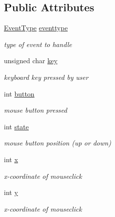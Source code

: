 \subsection*{Public Attributes}
\begin{DoxyCompactItemize}
\item 
\hypertarget{structEvent_ac88c22138e81d007cff4cab436f1143b}{}\hyperlink{util_8h_a2628ea8d12e8b2563c32f05dc7fff6fa}{Event\+Type} \hyperlink{structEvent_ac88c22138e81d007cff4cab436f1143b}{eventtype}\label{structEvent_ac88c22138e81d007cff4cab436f1143b}

\begin{DoxyCompactList}\small\item\em type of event to handle \end{DoxyCompactList}\item 
\hypertarget{structEvent_afd595f11f3290cb27aaf925f1b429783}{}unsigned char \hyperlink{structEvent_afd595f11f3290cb27aaf925f1b429783}{key}\label{structEvent_afd595f11f3290cb27aaf925f1b429783}

\begin{DoxyCompactList}\small\item\em keyboard key pressed by user \end{DoxyCompactList}\item 
\hypertarget{structEvent_a2b66667c284e4ec706958dbdf1bfc12b}{}int \hyperlink{structEvent_a2b66667c284e4ec706958dbdf1bfc12b}{button}\label{structEvent_a2b66667c284e4ec706958dbdf1bfc12b}

\begin{DoxyCompactList}\small\item\em mouse button pressed \end{DoxyCompactList}\item 
\hypertarget{structEvent_a1002e96b4f00878fb4751296cf7ae6fd}{}int \hyperlink{structEvent_a1002e96b4f00878fb4751296cf7ae6fd}{state}\label{structEvent_a1002e96b4f00878fb4751296cf7ae6fd}

\begin{DoxyCompactList}\small\item\em mouse button position (up or down) \end{DoxyCompactList}\item 
\hypertarget{structEvent_ab451062e9ceee3ff4ebbc5bfcb4a2af6}{}int \hyperlink{structEvent_ab451062e9ceee3ff4ebbc5bfcb4a2af6}{x}\label{structEvent_ab451062e9ceee3ff4ebbc5bfcb4a2af6}

\begin{DoxyCompactList}\small\item\em x-\/coordinate of mouseclick \end{DoxyCompactList}\item 
\hypertarget{structEvent_a3f0da856fc398144d2df10cc96f5147b}{}int \hyperlink{structEvent_a3f0da856fc398144d2df10cc96f5147b}{y}\label{structEvent_a3f0da856fc398144d2df10cc96f5147b}

\begin{DoxyCompactList}\small\item\em x-\/coordinate of mouseclick \end{DoxyCompactList}\end{DoxyCompactItemize}


